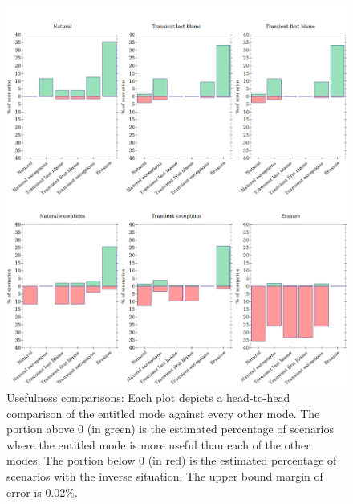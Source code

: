 \begin{figure}
  \centering
  \includegraphics[width=\textwidth]{./plots/avo-bars}
  \caption{Usefulness comparisons: Each plot depicts a head-to-head comparison of the entitled mode against every other mode.
  The portion above 0 (in green) is the estimated percentage of scenarios where the entitled mode is more useful than each of the other modes.
  The portion below 0 (in red) is the estimated percentage of scenarios with the inverse situation.
  The upper bound margin of error is 0.02\%.
  }
  \label{fig:avo-bars}
\end{figure}

